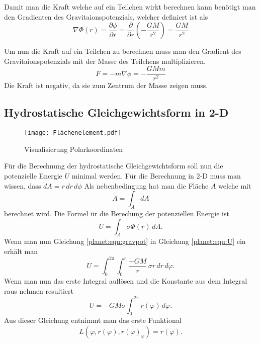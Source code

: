 Damit man die Kraft welche auf ein Teilchen wirkt berechnen kann benötigt man den Gradienten des Gravitaionspotenzials, welcher definiert ist als
\begin{equation}
	\nabla \Phi (r) = \frac{\partial \phi}{\partial r} = \frac{\partial}{\partial r} (-\frac{GM}{r^2}) = \frac{GM}{r^2}
\end{equation}

Um nun die Kraft auf ein Teilchen zu berechnen muss man den Gradient des Gravitaionspotenzials mit der Masse des Teilchens multiplizieren.
\begin{equation}
	F = -m\nabla \phi = -\frac{GMm}{r^2}
\end{equation}
Die Kraft ist negativ, da sie zum Zentrum der Masse zeigen muss.


\subsection{Hydrostatische Gleichgewichtsform in 2-D}
\begin{figure}
	\centering
	\texttt{[image: Flächenelement.pdf]}
	\caption{Visualisierung Polarkoordinaten}
\end{figure}
Für die Berechnung der hydrostatische Gleichgewichtsform soll nun die potenzielle Energie \(U\) minimal werden.
Für die Berechnung in 2-D muss man wissen, dass \(dA = r \, dr \, d\phi\)
Als nebenbedingung hat man die Fläche \(A\) welche mit 
\begin{equation}
	A = \int_{A}^{} dA
	\label{planet:equ:A}
\end{equation}
berechnet wird.
Die Formel ür die Berechung der potenziellen Energie ist
\begin{equation*}
	U = \int_{A} \sigma  \Phi (r) \, dA.
	\label{planet:equ:U}
\end{equation*}
Wenn man nun Gleichung \ref{planet:equ:gravpot} in Gleichung \ref{planet:equ:U} ein erhält man
\begin{equation*}
	U = \int_{0}^{2\pi}\int_{0}^{r} \frac{-GM}{r} \, \sigma r \, dr \, d\varphi.
\end{equation*}
Wenn man nun das erste Integral auflösen und die Konstante aus dem Integral raus nehmen resultiert 
\begin{equation}
	U =-GM\sigma \int_{0}^{2\pi} r(\varphi) \, d\varphi .
\end{equation}
Aus dieser Gleichung entnimmt man das erste Funktional
\begin{equation}
	L(\varphi ,r(\varphi),r(\varphi)_\varphi) = r(\varphi).
\end{equation}
